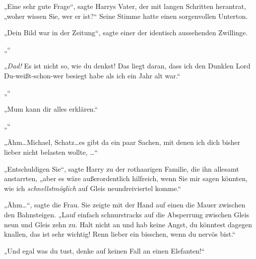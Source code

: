 „Eine sehr gute Frage“, sagte Harrys Vater, der mit langen Schritten herantrat, „woher wissen Sie, wer er ist?“ Seine Stimme hatte einen sorgenvollen Unterton.

„Dein Bild war in der Zeitung“, sagte einer der identisch aussehenden Zwillinge.

„“

„\emph{Dad!} Es ist nicht so, wie du denkst! Das liegt daran, dass ich den Dunklen Lord Du-weißt-schon-wer besiegt habe als ich ein Jahr alt war.“

„“

„Mum kann dir alles erklären.“

„“

„Ähm…Michael, Schatz…es gibt da ein paar Sachen, mit denen ich dich bisher lieber nicht belasten wollte, …“

„Entschuldigen Sie“, sagte Harry zu der rothaarigen Familie, die ihn allesamt anstarrten, „aber es wäre außerordentlich hilfreich, wenn Sie mir sagen könnten, wie ich \emph{schnellstmöglich} auf Gleis neundreiviertel komme.“

„Ähm…“, sagte die Frau. Sie zeigte mit der Hand auf einen die Mauer zwischen den Bahnsteigen. „Lauf einfach schnurstracks auf die Absperrung zwischen Gleis neun und Gleis zehn zu. Halt nicht an und hab keine Angst, du könntest dagegen knallen, das ist sehr wichtig! Renn lieber ein bisschen, wenn du nervös bist.“

„Und egal was du tust, denke auf keinen Fall an einen Elefanten!“


